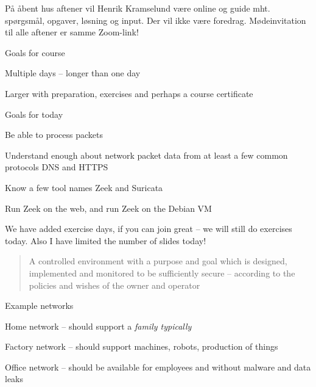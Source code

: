 \documentclass[Screen16to9,17pt]{foils}
\begin{document}
På åbent hus aftener vil Henrik Kramselund være online og guide mht. spørgsmål, opgaver, løsning og input. Der vil ikke være foredrag. Mødeinvitation til alle aftener er samme Zoom-link!



Goals for course
\begin{list2}
\item Multiple days -- longer than one day
\item Larger with preparation, exercises and perhaps a course certificate
\end{list2}

Goals for today
\begin{list2}
\item Be able to process packets
\item Understand enough about network packet data from at least a few common protocols DNS and HTTPS
\item Know a few tool names Zeek and Suricata
\item Run Zeek on the web, and run Zeek on the Debian VM
\end{list2}

We have added exercise days, if you can join great -- we will still do exercises today. Also I have limited the number of slides today!




\begin{quote}
A controlled environment with a purpose and goal which is designed, implemented and monitored to be sufficiently secure -- according to the policies and wishes of the owner and operator
\end{quote}

Example networks
\begin{list2}
\item Home network -- should support a \emph{family typically}
\item Factory network -- should support machines, robots, production of things
\item Office network -- should be available for employees and without malware and data leaks
\end{list2}

\end{document}
